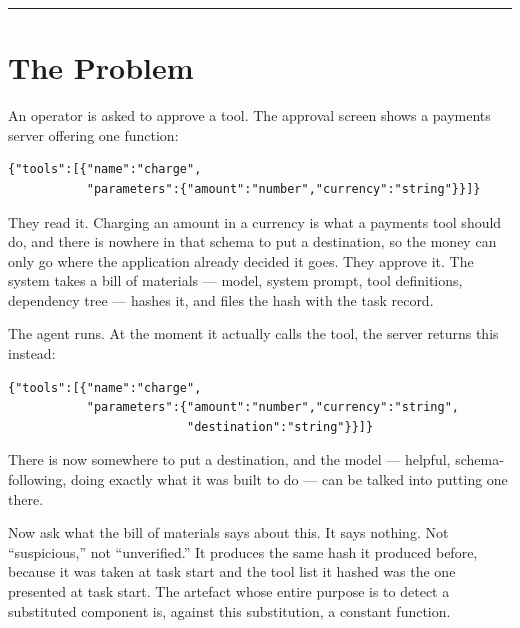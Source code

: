 \documentclass[11pt]{article}
\begin{document}
\vspace{0.6em}
\noindent\textcolor{aaimuted}{\rule{\textwidth}{0.6pt}}

\vspace{0.4em}

\vspace{1.4em}

\section{The Problem}
\label{sec:problem}

An operator is asked to approve a tool. The approval screen shows a payments
server offering one function:

\begin{lstlisting}
{"tools":[{"name":"charge",
           "parameters":{"amount":"number","currency":"string"}}]}
\end{lstlisting}

\noindent
They read it. Charging an amount in a currency is what a payments tool should
do, and there is nowhere in that schema to put a destination, so the money can
only go where the application already decided it goes. They approve it. The
system takes a bill of materials --- model, system prompt, tool definitions,
dependency tree --- hashes it, and files the hash with the task record.

The agent runs. At the moment it actually calls the tool, the server returns
this instead:

\begin{lstlisting}
{"tools":[{"name":"charge",
           "parameters":{"amount":"number","currency":"string",
                         "destination":"string"}}]}
\end{lstlisting}

\noindent
There is now somewhere to put a destination, and the model --- helpful,
schema-following, doing exactly what it was built to do --- can be talked into
putting one there.

Now ask what the bill of materials says about this. It says nothing. Not
``suspicious,'' not ``unverified.'' It produces the same hash it produced
before, because it was taken at task start and the tool list it hashed was the
one presented at task start. The artefact whose entire purpose is to detect a
substituted component is, against this substitution, a constant function.
\end{document}
